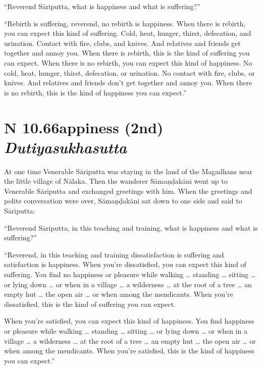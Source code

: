 \documentclass[12pt,openany]{book}%
\newcommand*{\suttatitleacronym}[1]{\smaller[2]{#1}\vspace*{.3em}}
\newcommand*{\suttatitletranslation}[1]{\linebreak{#1}}
\newcommand*{\suttatitleroot}[1]{\linebreak\smaller[2]\itshape{#1}}
\newcommand*{\tocacronym}[1]{\hspace*{-3.3em}{#1}\quad}
\newcommand*{\toctranslation}[1]{#1}
\newcommand*{\tocroot}[1]{(\textit{#1})}
\begin{document}
“Reverend \textsanskrit{Sāriputta}, what is happiness and what is suffering?” 

“Rebirth is suffering, reverend, no rebirth is happiness. When there is rebirth, you can expect this kind of suffering. Cold, heat, hunger, thirst, defecation, and urination. Contact with fire, clubs, and knives. And relatives and friends get together and annoy you. When there is rebirth, this is the kind of suffering you can expect. When there is no rebirth, you can expect this kind of happiness. No cold, heat, hunger, thirst, defecation, or urination. No contact with fire, clubs, or knives. And relatives and friends don’t get together and annoy you. When there is no rebirth, this is the kind of happiness you can expect.” 

%
\section*{{\suttatitleacronym AN 10.66}{\suttatitletranslation Happiness (2nd) }{\suttatitleroot Dutiyasukhasutta}}
\addcontentsline{toc}{section}{\tocacronym{AN 10.66} \toctranslation{Happiness (2nd) } \tocroot{Dutiyasukhasutta}}

At one time Venerable \textsanskrit{Sāriputta} was staying in the land of the Magadhans near the little village of \textsanskrit{Nālaka}. Then the wanderer \textsanskrit{Sāmaṇḍakāni} went up to Venerable \textsanskrit{Sāriputta} and exchanged greetings with him. When the greetings and polite conversation were over, \textsanskrit{Sāmaṇḍakāni} sat down to one side and said to \textsanskrit{Sāriputta}: 

“Reverend \textsanskrit{Sāriputta}, in this teaching and training, what is happiness and what is suffering?” 

“Reverend, in this teaching and training dissatisfaction is suffering and satisfaction is happiness. When you’re dissatisfied, you can expect this kind of suffering. You find no happiness or pleasure while walking … standing … sitting … or lying down … or when in a village … a wilderness … at the root of a tree … an empty hut … the open air … or when among the mendicants. When you’re dissatisfied, this is the kind of suffering you can expect. 

When you’re satisfied, you can expect this kind of happiness. You find happiness or pleasure while walking … standing … sitting … or lying down … or when in a village … a wilderness … at the root of a tree … an empty hut … the open air … or when among the mendicants. When you’re satisfied, this is the kind of happiness you can expect.” 
\end{document}

